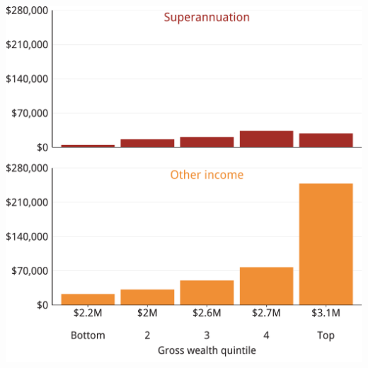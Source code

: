 \documentclass[tikz]{standalone}\usepackage[]{graphicx}\usepackage[]{color}
\newenvironment{knitrout}{}{} %
\begin{document}
\begin{knitrout}
\color{fgcolor}
\includegraphics[width=11.000in,height=11in]{./Super-tax-targeting/b5-super-atlas/Figure3-4-1} 

\end{knitrout}
\end{document}
